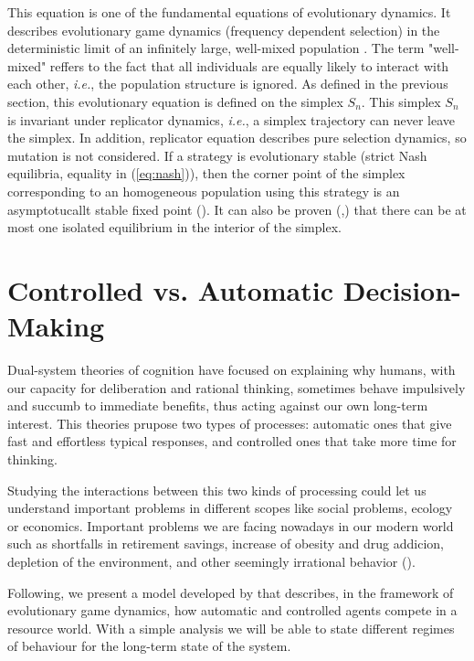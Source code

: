 \documentclass[10pt,a4paper]{article}
\begin{document}
This equation is one of the fundamental equations of evolutionary dynamics. It describes evolutionary game dynamics (frequency dependent selection) in the deterministic
limit of an infinitely large, well-mixed population \cite{Ohtsuki:replicator}. The term "well-mixed" reffers to the fact that all individuals are equally likely to interact with each other,
\emph{i.e.}, the population structure is ignored. As defined in the previous section, this evolutionary equation is defined on the simplex $S_n$. This simplex $S_n$ is invariant
under replicator dynamics, \emph{i.e.}, a simplex trajectory can never leave the simplex. In addition, replicator equation describes pure selection dynamics, so mutation is not considered.
If a strategy is evolutionary stable (strict Nash equilibria, equality in (\ref{eq:nash})), then the corner point of the simplex corresponding to an homogeneous population using this
strategy is an asymptotucallt stable fixed point (\cite{Ohtsuki:replicator}). It can also be proven (\cite{Nowak:book},\cite{Cressman:replicator}) that there can be at most one isolated
equilibrium in the interior of the simplex.

\section{Controlled vs. Automatic Decision-Making}

Dual-system theories of cognition \cite{Cohen:1990, Miller:2001, Posner:1975, Schneider:1977, Shiffrin:1977, Barrett:2006} have focused on explaining
why humans, with our capacity for deliberation and rational thinking, sometimes behave impulsively and succumb to immediate benefits, thus acting against our own 
long-term interest. This theories prupose two types of processes: automatic ones that give fast and effortless typical responses, and controlled ones that take more time
for thinking. 

Studying the interactions between this two kinds of processing could let us understand important problems in different scopes like social problems, ecology
or economics. Important problems we are facing nowadays in our modern world such as shortfalls in retirement savings, increase of obesity and drug addicion, depletion of the environment,
and other seemingly irrational behavior (\cite{Ariely:2008,Loewenstein:1996}). 

Following, we present a model developed by \cite{Strogatz:evolutionary} that describes, in the framework of evolutionary game dynamics, how automatic and controlled agents
compete in a resource world. With a simple analysis we will be able to state different regimes of behaviour for the long-term state of the system.
\end{document}
